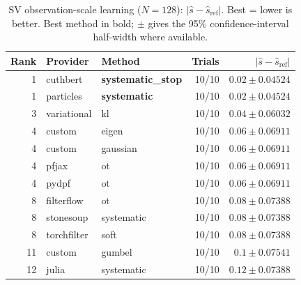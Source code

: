 \begin{table}[!htbp]
\centering
\small
\caption{SV observation-scale learning ($N=128$): $|\hat{s}-\hat{s}_{\mathrm{ref}}|$. Best = lower is better. Best method in bold; $\pm$ gives the 95\% confidence-interval half-width where available.}
\label{tab:sv-observation-scale-learning-mle-reference-error}
\begin{tabular}{rllrr}
\toprule
Rank & Provider & Method & Trials & $|\hat{s}-\hat{s}_{\mathrm{ref}}|$ \\
\midrule
1 & cuthbert & \textbf{systematic\_stop} & 10/10 & $\mathbf{0.02 \pm 0.04524}$ \\
1 & particles & \textbf{systematic} & 10/10 & $\mathbf{0.02 \pm 0.04524}$ \\
3 & variational & kl & 10/10 & $0.04 \pm 0.06032$ \\
4 & custom & eigen & 10/10 & $0.06 \pm 0.06911$ \\
4 & custom & gaussian & 10/10 & $0.06 \pm 0.06911$ \\
4 & pfjax & ot & 10/10 & $0.06 \pm 0.06911$ \\
4 & pydpf & ot & 10/10 & $0.06 \pm 0.06911$ \\
8 & filterflow & ot & 10/10 & $0.08 \pm 0.07388$ \\
8 & stonesoup & systematic & 10/10 & $0.08 \pm 0.07388$ \\
8 & torchfilter & soft & 10/10 & $0.08 \pm 0.07388$ \\
11 & custom & gumbel & 10/10 & $0.1 \pm 0.07541$ \\
12 & julia & systematic & 10/10 & $0.12 \pm 0.07388$ \\
\bottomrule
\end{tabular}
\end{table}

